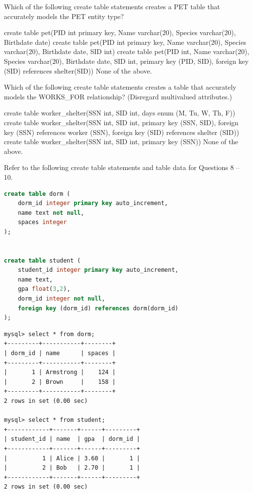 \documentclass[10pt]{exam}
\begin{document}
\begin{questions}
\question[4] Which of the following create table statements creates a PET table that accurately models the PET entity type?

\begin{choices}
\choice create table pet(PID int primary key, Name varchar(20), Species varchar(20), Birthdate date)
\choice create table pet(PID int primary key, Name varchar(20), Species varchar(20), Birthdate date, SID int)
\correctchoice create table pet(PID int, Name varchar(20), Species varchar(20), Birthdate date, SID int, primary key (PID, SID), foreign key (SID) references shelter(SID))
\choice None of the above.
\end{choices}

\question[4] Which of the following create table statements creates a table that accurately models the WORKS\_FOR relationship? (Disregard multivalued attributes.)

\begin{choices}
\choice create table worker\_shelter(SSN int, SID int, days enum (M, Tu, W, Th, F))
\correctchoice create table worker\_shelter(SSN int, SID int, primary key (SSN, SID), foreign key (SSN) references worker (SSN), foreign key (SID) references shelter (SID))
\choice create table worker\_shelter(SSN int, SID int, primary key (SSN))
\choice None of the above.
\end{choices}

\newpage

Refer to the following create table statements and table data for Questions 8 -- 10.

\begin{lstlisting}[language=sql]
create table dorm (
    dorm_id integer primary key auto_increment,
    name text not null,
    spaces integer
);


create table student (
    student_id integer primary key auto_increment,
    name text,
    gpa float(3,2),
    dorm_id integer not null,
    foreign key (dorm_id) references dorm(dorm_id)
);
\end{lstlisting}


\begin{verbatim}
mysql> select * from dorm;
+---------+-----------+--------+
| dorm_id | name      | spaces |
+---------+-----------+--------+
|       1 | Armstrong |    124 |
|       2 | Brown     |    158 |
+---------+-----------+--------+
2 rows in set (0.00 sec)

mysql> select * from student;
+------------+-------+------+---------+
| student_id | name  | gpa  | dorm_id |
+------------+-------+------+---------+
|          1 | Alice | 3.60 |       1 |
|          2 | Bob   | 2.70 |       1 |
+------------+-------+------+---------+
2 rows in set (0.00 sec)


\end{verbatim}
\end{questions}
\end{document}
